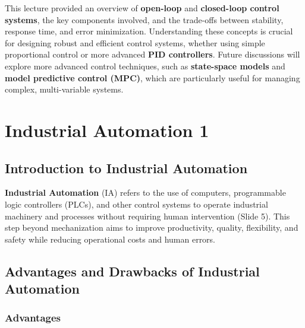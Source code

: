 \documentclass[
  14pt,
  a4paper,
  numbers=noendperiod,
  headinclude=true,
  footinclude=true,
  DIV=calc]{scrreprt}
\begin{document}
This lecture provided an overview of \textbf{open-loop} and
\textbf{closed-loop control systems}, the key components involved, and
the trade-offs between stability, response time, and error minimization.
Understanding these concepts is crucial for designing robust and
efficient control systems, whether using simple proportional control or
more advanced \textbf{PID controllers}. Future discussions will explore
more advanced control techniques, such as \textbf{state-space models}
and \textbf{model predictive control (MPC)}, which are particularly
useful for managing complex, multi-variable systems.

\chapter{Industrial Automation 1}\label{industrial-automation-1}

\section{Introduction to Industrial
Automation}\label{introduction-to-industrial-automation}

\textbf{Industrial Automation} (IA) refers to the use of computers,
programmable logic controllers (PLCs), and other control systems to
operate industrial machinery and processes without requiring human
intervention (Slide 5). This step beyond mechanization aims to improve
productivity, quality, flexibility, and safety while reducing
operational costs and human errors.

\section{Advantages and Drawbacks of Industrial
Automation}\label{advantages-and-drawbacks-of-industrial-automation}

\subsection{Advantages}\label{advantages}
\end{document}

